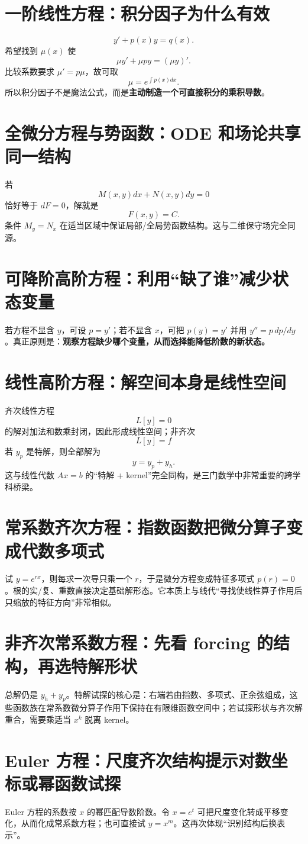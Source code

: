 \documentclass[11pt,a4paper,openany]{ctexbook}
\newcommand{\key}[1]{\textbf{\color{deep}#1}}
\begin{document}
\section{一阶线性方程：积分因子为什么有效}
\[
y'+p(x)y=q(x).
\]
希望找到 $\mu(x)$ 使
\[
\mu y'+\mu py=(\mu y)'.
\]
比较系数要求 $\mu'=p\mu$，故可取
\[
\mu=e^{\int p(x)dx}.
\]
所以积分因子不是魔法公式，而是\key{主动制造一个可直接积分的乘积导数}。

\section{全微分方程与势函数：ODE 和场论共享同一结构}
若
\[
M(x,y)dx+N(x,y)dy=0
\]
恰好等于 $dF=0$，解就是
\[
F(x,y)=C.
\]
条件 $M_y=N_x$ 在适当区域中保证局部/全局势函数结构。这与二维保守场完全同源。

\section{可降阶高阶方程：利用“缺了谁”减少状态变量}
若方程不显含 $y$，可设 $p=y'$；若不显含 $x$，可把 $p(y)=y'$ 并用 $y''=p\,dp/dy$。真正原则是：\key{观察方程缺少哪个变量，从而选择能降低阶数的新状态。}

\section{线性高阶方程：解空间本身是线性空间}
齐次线性方程
\[
L[y]=0
\]
的解对加法和数乘封闭，因此形成线性空间；非齐次
\[
L[y]=f
\]
若 $y_p$ 是特解，则全部解为
\[
\boxed{y=y_p+y_h}.
\]
这与线性代数 $Ax=b$ 的“特解 + kernel”完全同构，是三门数学中非常重要的跨学科桥梁。

\section{常系数齐次方程：指数函数把微分算子变成代数多项式}
试 $y=e^{rx}$，则每求一次导只乘一个 $r$，于是微分方程变成特征多项式 $p(r)=0$。根的实/复、重数直接决定基础解形态。它本质上与线代“寻找使线性算子作用后只缩放的特征方向”非常相似。

\section{非齐次常系数方程：先看 forcing 的结构，再选特解形状}
总解仍是 $y_h+y_p$。特解试探的核心是：右端若由指数、多项式、正余弦组成，这些函数族在常系数微分算子作用下保持在有限维函数空间中；若试探形状与齐次解重合，需要乘适当 $x^k$ 脱离 kernel。

\section{Euler 方程：尺度齐次结构提示对数坐标或幂函数试探}
Euler 方程的系数按 $x$ 的幂匹配导数阶数。令 $x=e^t$ 可把尺度变化转成平移变化，从而化成常系数方程；也可直接试 $y=x^m$。这再次体现“识别结构后换表示”。
\end{document}
